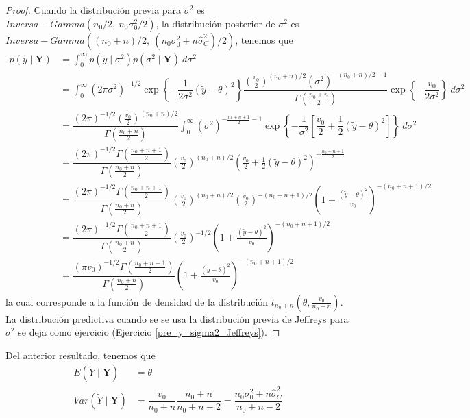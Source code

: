     \begin{proof}
    Cuando la distribuci\'on previa para $\sigma^2$ es $Inversa-Gamma(n_0/2,\ n_0\sigma^2_0/2)$, la distribuci\'on posterior de $\sigma^2$ es $Inversa-Gamma((n_0+n)/2,\ (n_0\sigma^2_0+n\hat{\sigma}^2_C)/2)$, tenemos que 
    \begin{align*}
    p(\tilde{y}\mid\mathbf{Y})&=\int_0^\infty p(\tilde{y}\mid\sigma^2)p(\sigma^2\mid\mathbf{Y})\ d\sigma^2\\
    &=\int_0^\infty (2\pi\sigma^2)^{-1/2}\exp\left\{-\dfrac{1}{2\sigma^2}(\tilde{y}-\theta)^2\right\}\dfrac{(\frac{v_0}{2})^{(n_0+n)/2}(\sigma^2)^{-(n_0+n)/2-1}}{\Gamma(\frac{n_0+n}{2})}\exp\left\{-\dfrac{v_0}{2\sigma^2}\right\}\ d\sigma^2\\
    &=\dfrac{(2\pi)^{-1/2}(\frac{v_0}{2})^{(n_0+n)/2}}{\Gamma(\frac{n_0+n}{2})}\int_0^\infty(\sigma^2)^{-\frac{n_0+n+1}{2}-1}\exp\left\{-\dfrac{1}{\sigma^2}\left[\dfrac{v_0}{2}+\dfrac{1}{2}(\tilde{y}-\theta)^2\right]\right\}\ d\sigma^2\\
    &=\dfrac{(2\pi)^{-1/2}\Gamma(\frac{n_0+n+1}{2})}{\Gamma(\frac{n_0+n}{2})}\left(\frac{v_0}{2}\right)^{(n_0+n)/2}
    \left(\frac{v_0}{2}+\frac{1}{2}(\tilde{y}-\theta)^2\right)^{-\frac{n_0+n+1}{2}}\\
    &=\dfrac{(2\pi)^{-1/2}\Gamma(\frac{n_0+n+1}{2})}{\Gamma(\frac{n_0+n}{2})}\left(\frac{v_0}{2}\right)^{(n_0+n)/2}\left(\frac{v_0}{2}\right)^{-(n_0+n+1)/2}\left(1+\frac{(\tilde{y}-\theta)^2}{v_0}\right)^{-(n_0+n+1)/2}\\
    &=\dfrac{(2\pi)^{-1/2}\Gamma(\frac{n_0+n+1}{2})}{\Gamma(\frac{n_0+n}{2})}\left(\frac{v_0}{2}\right)^{-1/2}\left(1+\frac{(\tilde{y}-\theta)^2}{v_0}\right)^{-(n_0+n+1)/2}\\
    &=\dfrac{(\pi v_0)^{-1/2}\Gamma(\frac{n_0+n+1}{2})}{\Gamma(\frac{n_0+n}{2})}\left(1+\frac{(\tilde{y}-\theta)^2}{v_0}\right)^{-(n_0+n+1)/2}
    \end{align*}
    la cual corresponde a la funci\'on de densidad de la distribuci\'on $t_{n_0+n}\left(\theta,\frac{v_0}{n_0+n}\right)$. La distribuci\'on predictiva cuando se se usa la distribuci\'on previa de Jeffreys para $\sigma^2$ se deja como ejercicio (Ejercicio \ref{pre_y_sigma2_Jeffreys}).
    \end{proof}
    
    Del anterior resultado, tenemos que
    \begin{align*}
    E(\tilde{Y}\mid\mathbf{Y})&=\theta\\
    Var(\tilde{Y}\mid\mathbf{Y})&=\dfrac{v_0}{n_0+n}\dfrac{n_0+n}{n_0+n-2}=\dfrac{n_0\sigma^2_0+n\hat{\sigma}^2_C}{n_0+n-2}\\
    \end{align*}
    
